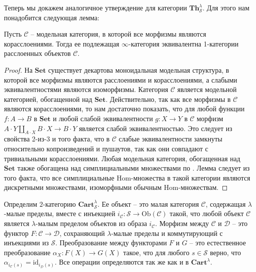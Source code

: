 \documentclass[reqno]{amsart}
\theoremstyle{definition}
\theoremstyle{remark}
\newcommand{\bcat}[1]{\mathbf{#1}}
\newcommand{\cat}[1]{\mathcal{#1}}
\renewcommand{\C}{\cat{C}}
\newcommand{\D}{\cat{D}}
\newcommand{\Set}{\bcat{Set}}
\newcommand{\fs}[1]{\mathrm{#1}}
\newcommand{\Hom}{\fs{Hom}}
\newcommand{\Th}{\bcat{Th}}
\begin{document}
Теперь мы докажем аналогичное утверждение для категории $\Th^\lambda_\mathcal{S}$.
Для этого нам понадобится следующая лемма:

\begin{lem}
Пусть $\C$ -- модельная категория, в которой все морфизмы являются корасслоениями.
Тогда ее подлежащая $\infty$-категория эквивалентна 1-категории расслоенных объектов $\C$.
\end{lem}
\begin{proof}
На $\Set$ существует декартова моноидальная модельная структура, в которой все морфизмы являются расслоениями и корасслоениями, а слабыми эквивалентностями являются изоморфизмы.
Категория $\C$ является модельной категорией, обогащенной над $\Set$.
Действительно, так как все морфизмы в $\C$ являются корасслоениями, то нам достаточно показать,
что для любой функции $f : A \to B$ в $\Set$ и любой слабой эквивалентности $g : X \to Y$ в $\C$ морфизм $A \cdot Y \amalg_{A \cdot X} B \cdot X \to B \cdot Y$ является слабой эквивалентностью.
Это следует из свойства 2-из-3 и того факта, что в $\C$ слабые эквивалентности замкнуты относительно копроизведений и пушаутов, так как они совпадают с тривиальными корасслоениями.
Любая модельная категория, обогащенная над $\Set$ также обогащена над симплициальными множествами по \cite[Proposition~3.8]{enriched-model-cats}.
Лемма следует из того факта, что все симплициальные $\Hom$-множества в такой категории являются дискретными множествами, изоморфными обычным $\Hom$-множествам.
\end{proof}

Определим $2$-категорию $\bcat{Cart}^\lambda_\mathcal{S}$.
Ее объект -- это малая категория $\C$, содержащая $\lambda$-малые пределы, вместе с инъекцией $i_\C : \mathcal{S} \to \fs{Ob}(\C)$ такой, что любой объект $\C$ является $\lambda$-малым пределом объектов из образа $i_\C$.
Морфизм между $\C$ и $\D$ -- это функтор $F : \C \to \D$, сохраняющий $\lambda$-малые пределы и коммутирующий с инъекциями из $\mathcal{S}$.
Преобразование между функторами $F$ и $G$ -- это естественное преобразование $\alpha_X : F(X) \to G(X)$ такое, что для любого $s \in \mathcal{S}$ верно, что $\alpha_{i_\C(s)} = \fs{id}_{i_\D(s)}$.
Все операции определяются так же как и в $\bcat{Cart}^\lambda$.
\end{document}
